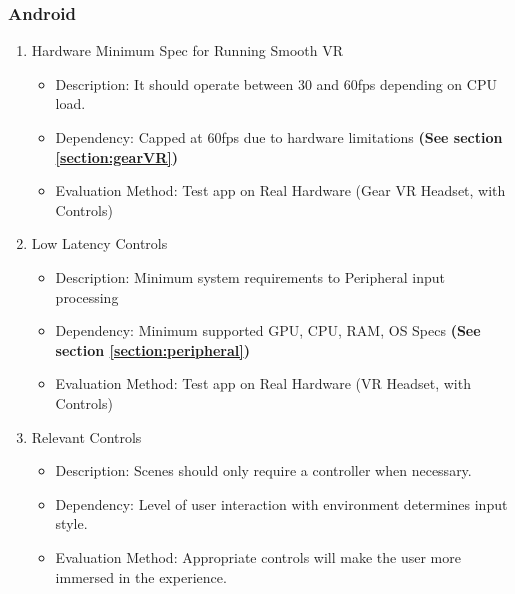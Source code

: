 \documentclass[a4paper,10pt]{article}
\begin{document}
	\subsubsection{Android}
		\begin{enumerate}
			\item Hardware Minimum Spec for Running Smooth VR
			\begin{itemize}
				\item Description: It should operate between 30 and 60fps depending on CPU load.
				\item Dependency: Capped at 60fps due to hardware limitations \textbf{(See section \ref{section:gearVR})}
				\item Evaluation Method: Test app on Real Hardware (Gear VR Headset, with Controls)
			\end{itemize}
			\item Low Latency Controls
			\begin{itemize}
				\item Description: Minimum system requirements to Peripheral input processing
				\item Dependency: Minimum supported GPU, CPU, RAM, OS Specs \textbf{(See section \ref{section:peripheral})}
				\item Evaluation Method: Test app on Real Hardware (VR Headset, with Controls)
			\end{itemize}
			\item Relevant Controls
			\begin{itemize}
				\item Description: Scenes should only require a controller when necessary.
				\item Dependency: Level of user interaction with environment determines input style.
				\item Evaluation Method: Appropriate controls will make the user more immersed in the experience.
			\end{itemize}
		\end{enumerate}
	
\end{document}
